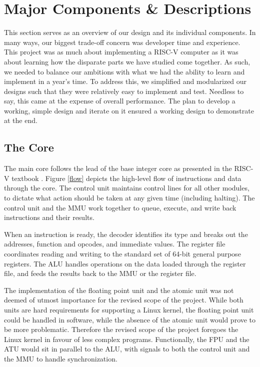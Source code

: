 \documentclass{article}
\begin{document}
\section{Major Components \& Descriptions}
    This section serves as an overview of our design and its individual components.  In many ways, our biggest trade-off concern was developer time and experience.  This project was as much about implementing a RISC-V computer as it was about learning how the disparate parts we have studied come together.  As such, we needed to balance our ambitions with what we had the ability to learn and implement in a year's time.  To address this, we simplified and modularized our designs such that they were relatively easy to implement and test.  Needless to say, this came at the expense of overall performance.  The plan to develop a working, simple design and iterate on it ensured a working design to demonstrate at the end.
    
    \subsection{The Core}
    The main core follows the lead of the base integer core as presented in the RISC-V textbook \cite{RISCV_TEXT}.  Figure \ref{flow} depicts the high-level flow of instructions and data through the core.  The control unit maintains control lines for all other modules, to dictate what action should be taken at any given time (including halting).  The control unit and the MMU work together to queue, execute, and write back instructions and their results.
    
    When an instruction is ready, the decoder identifies its type and breaks out the addresses, function and opcodes, and immediate values.  The register file coordinates reading and writing to the standard set of 64-bit general purpose registers.  The ALU handles operations on the data loaded through the register file, and feeds the results back to the MMU or the register file.

    The implementation of the floating point unit and the atomic unit was not deemed of utmost importance for the revised scope of the project. While both units are hard requirements for supporting a Linux kernel, the floating point unit could be handled in software, while the absence of the atomic unit would prove to be more problematic. Therefore the revised scope of the project foregoes the Linux kernel in favour of less complex programs. Functionally, the FPU and the ATU would sit in parallel to the ALU, with signals to both the control unit and the MMU to handle synchronization.
    
\end{document}
